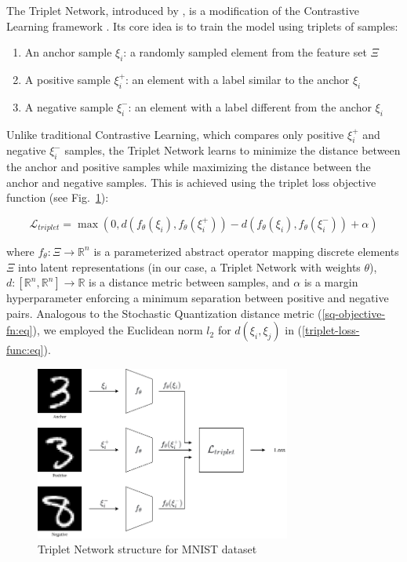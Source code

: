 The Triplet Network, introduced by \cite{Hoffer_2015}, is a modification of the Contrastive Learning framework \cite{Khosla_2020}. Its core idea is to train the model using triplets of samples:

\begin{enumerate}
    \item An anchor sample $\xi_i$: a randomly sampled element from the feature set $\Xi$
    \item A positive sample $\xi^+_i$: an element with a label similar to the anchor $\xi_i$
    \item A negative sample $\xi^-_i$: an element with a label different from the anchor $\xi_i$
\end{enumerate}

Unlike traditional Contrastive Learning, which compares only positive $\xi^+_i$ and negative $\xi^-_i$ samples, the Triplet Network learns to minimize the distance between the anchor and positive samples while maximizing the distance between the anchor and negative samples. This is achieved using the triplet loss objective function (see Fig.~\ref{triplet-network:fig}):

\begin{equation}
    \label{triplet-loss-func:eq}
    \mathcal{L}_{triplet} = \max (0, d(f_{\theta}(\xi_i), f_{\theta}(\xi^+_i)) - d(f_{\theta}(\xi_i), f_{\theta}(\xi^-_i)) + \alpha)
\end{equation}

\noindent where $f_{\theta}: \Xi \to \mathbb{R}^n$ is a parameterized abstract operator mapping discrete elements $\Xi$ into latent representations (in our case, a Triplet Network with weights $\theta$), $d: [\mathbb{R}^n, \mathbb{R}^n] \to \mathbb{R}$ is a distance metric between samples, and $\alpha$ is a margin hyperparameter enforcing a minimum separation between positive and negative pairs. Analogous to the Stochastic Quantization distance metric (\ref{sq-objective-fn:eq}), we employed the Euclidean norm $l_2$ for $d(\xi_i, \xi_j)$ in (\ref{triplet-loss-func:eq}).

\begin{figure}
    \centering
    \includegraphics[width=0.75\textwidth]{figures/triplet_loss.png}
    \caption{Triplet Network structure for MNIST dataset \cite{lecun2010mnist}} \label{triplet-network:fig}
\end{figure}

